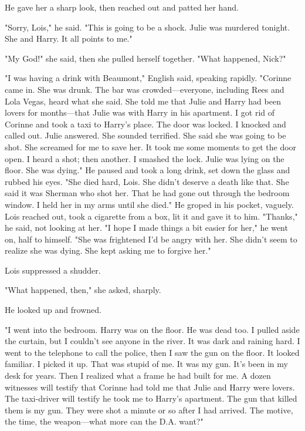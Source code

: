 \documentclass{novel}
\begin{document}
He gave her a sharp look, then reached out and patted her hand.

"Sorry, Lois," he said. "This is going to be a shock. Julie was murdered tonight. She and Harry. It all points to me."

"My God!" she said, then she pulled herself together. "What happened, Nick?"

"I was having a drink with Beaumont," English said, speaking rapidly. "Corinne came in. She was drunk. The bar was crowded—everyone, including Rees and Lola Vegas, heard what she said. She told me that Julie and Harry had been lovers for months—that Julie was with Harry in his apartment. I got rid of Corinne and took a taxi to Harry's place. The door was locked. I knocked and called out. Julie answered. She sounded terrified. She said she was going to be shot. She screamed for me to save her. It took me some moments to get the door open. I heard a shot; then another. I smashed the lock. Julie was lying on the floor. She was dying." He paused and took a long drink, set down the glass and rubbed his eyes. "She died hard, Lois. She didn't deserve a death like that. She said it was Sherman who shot her. That he had gone out through the bedroom window. I held her in my arms until she died." He groped in his pocket, vaguely. Lois reached out, took a cigarette from a box, lit it and gave it to him. "Thanks," he said, not looking at her. "I hope I made things a bit easier for her," he went on, half to himself. "She was frightened I'd be angry with her. She didn't seem to realize she was dying. She kept asking me to forgive her."

Lois suppressed a shudder.

"What happened, then," she asked, sharply.

He looked up and frowned.

"I went into the bedroom. Harry was on the floor. He was dead too. I pulled aside the curtain, but I couldn't see anyone in the river. It was dark and raining hard. I went to the telephone to call the police, then I saw the gun on the floor. It looked familiar. I picked it up. That was stupid of me. It was my gun. It's been in my desk for years. Then I realized what a frame he had built for me. A dozen witnesses will testify that Corinne had told me that Julie and Harry were lovers. The taxi-driver will testify he took me to Harry's apartment. The gun that killed them is my gun. They were shot a minute or so after I had arrived. The motive, the time, the weapon—what more can the D.A. want?"
\end{document}
